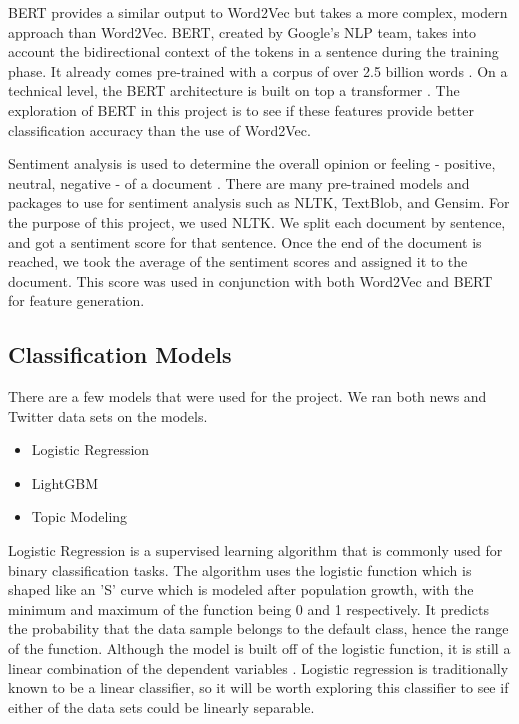 \documentclass[conference]{IEEEtran}
\begin{document}
BERT provides a similar output to Word2Vec but takes a more complex, modern approach than Word2Vec. BERT, created by Google's NLP team, takes into account the bidirectional context of the tokens in a sentence during the training phase. It already comes pre-trained with a corpus of over 2.5 billion words \cite{b13}. On a technical level, the BERT architecture is built on top a transformer \cite{b11}. The exploration of BERT in this project is to see if these features provide better classification accuracy than the use of Word2Vec.

Sentiment analysis is used to determine the overall opinion or feeling - positive, neutral, negative - of a document \cite{b8}. There are many pre-trained models and packages to use for sentiment analysis such as NLTK, TextBlob, and Gensim. For the purpose of this project, we used NLTK. We split each document by sentence, and got a sentiment score for that sentence. Once the end of the document is reached, we took the average of the sentiment scores and assigned it to the document. This score was used in conjunction with both Word2Vec and BERT for feature generation.

\subsection{Classification Models}
There are a few models that were used for the project. We ran both news and Twitter data sets on the models.
\begin{itemize}
    \item Logistic Regression
    \item LightGBM
    \item Topic Modeling
\end{itemize}

Logistic Regression is a supervised learning algorithm that is commonly used for binary classification tasks. The algorithm uses the logistic function which is shaped like an 'S' curve which is modeled after population growth, with the minimum and maximum of the function being 0 and 1 respectively. It predicts the probability that the data sample belongs to the default class, hence the range of the function. Although the model is built off of the logistic function, it is still a linear combination of the dependent variables \cite{b7}. Logistic regression is traditionally known to be a linear classifier, so it will be worth exploring this classifier to see if either of the data sets could be linearly separable.
\end{document}
